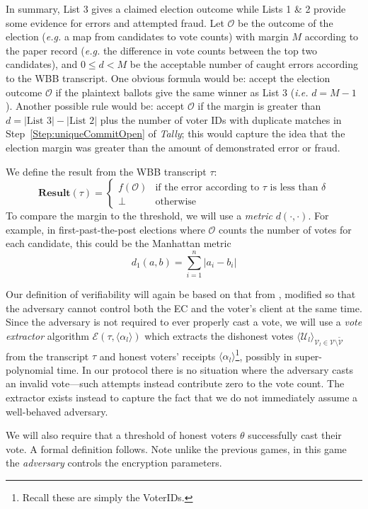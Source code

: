 \documentclass[12pt,a4paper]{article}
\theoremstyle{definition}
\newcommand{\ie}{\textit{i.e. }}
\newcommand{\eg}{\textit{e.g. }}
\begin{document}
In summary, List 3 gives a claimed election outcome while Lists 1 \& 2 provide some evidence for errors and attempted fraud. Let $\mathcal{O}$ be the outcome of the election (\eg a map from candidates to vote counts) with margin $M$ according to the paper record (\eg the difference in vote counts between the top two candidates), and $0 \leq d < M$ be the acceptable number of caught errors according to the WBB transcript. One obvious formula would be: accept the election outcome $\mathcal{O}$ if the plaintext ballots give the same winner as List 3 (\ie $d = M - 1$).  Another possible rule would be: accept $\mathcal{O}$ if the margin is greater than
$d = |\text{List 3}| - |\text{List 2}|$ 
plus the number of voter IDs with duplicate matches in Step~\ref{Step:uniqueCommitOpen} of \textit{Tally}; this would capture the idea that the election margin was greater than the amount of demonstrated error or fraud.

We define the result from the WBB transcript $\tau$:
$$\mathbf{Result}(\tau)=
\begin{cases}
    f(\mathcal{O})  &   \text{if the error according to }\tau\text{ is less than }\delta\\
    \bot            &   \text{otherwise}
\end{cases}$$
To compare the margin to the threshold, we will use a \textit{metric} $d(\cdot,\cdot)$. For example, in first-past-the-post elections where $\mathcal{O}$ counts the number of votes for each candidate, this could be the Manhattan metric
$$d_1(a, b)=\sum_{i=1}^n |a_i-b_i|$$

Our definition of verifiability will again be based on that from \cite{kiayias2015end}, modified so that the adversary cannot control both the EC and the voter's client at the same time. Since the adversary is not required to ever properly cast a vote, we will use a \textit{vote extractor} algorithm $\mathcal{E}\left(\tau, \langle \alpha_l \rangle\right)$ which extracts the dishonest votes $\langle \mathcal{U}_l \rangle_{\mathcal{V}_l\in\mathcal{V}\setminus\tilde{\mathcal{V}}}$ from the transcript $\tau$ and honest voters' receipts $\langle \alpha_l \rangle$\footnote{Recall these are simply the VoterIDs.}, possibly in super-polynomial time. In our protocol there is no situation where the adversary casts an invalid vote---such attempts instead contribute zero to the vote count. The extractor exists instead to capture the fact that we do not immediately assume a well-behaved adversary.

We will also require that a threshold of honest voters $\theta$ successfully cast their vote. A formal definition follows. Note unlike the previous games, in this game the \textit{adversary} controls the encryption parameters.
\end{document}
